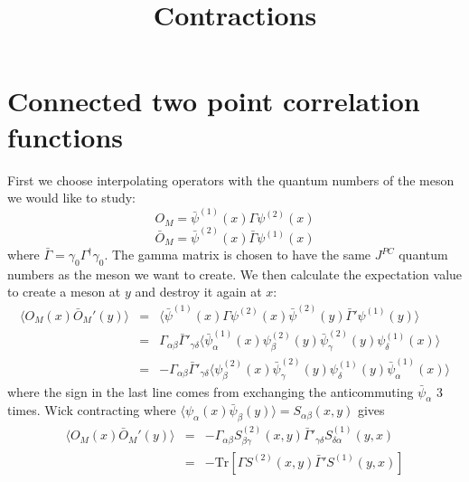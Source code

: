 \documentclass[3p,preprint]{elsarticle}
\begin{document}
\title{Contractions}

\section{Connected two point correlation functions}

First we choose interpolating operators with the quantum numbers of the meson we would like to study:
\begin{equation}
O_M = \bar{\psi}^{(1)}(x) \Gamma \psi^{(2)}(x)
\end{equation}
\begin{equation}
\bar{O}_M = \bar{\psi}^{(2)}(x) \bar{ \Gamma } \psi^{(1)}(x)
\end{equation}
where $\bar{ \Gamma } = \gamma_0 \Gamma^\dagger \gamma_0$. The gamma matrix is chosen to have the same $J^{PC}$
quantum numbers as the meson we want to create. We then calculate the expectation value to create a meson at
$y$ and destroy it again at $x$:
\begin{eqnarray}
\langle O_M(x) \bar{O}_M'(y) \rangle &=& \langle \bar{\psi}^{(1)}(x) \Gamma \psi^{(2)}(x) \bar{\psi}^{(2)}(y) \bar{ \Gamma }' \psi^{(1)}(y) \rangle 
\\
&=& \Gamma_{\alpha \beta} \bar{ \Gamma }'_{\gamma \delta} \langle \bar{\psi}^{(1)}_\alpha(x)  \psi^{(2)}_\beta(y) \bar{\psi}^{(2)}_\gamma(y)  \psi^{(1)}_\delta(x) \rangle \\
&=& -\Gamma_{\alpha \beta} \bar{ \Gamma }'_{\gamma \delta} \langle \psi^{(2)}_\beta(x) \bar{\psi}^{(2)}_\gamma(y)  \psi^{(1)}_\delta(y) 
\bar{\psi}^{(1)}_\alpha (x) \rangle
\end{eqnarray}
where the sign in the last line comes from exchanging the anticommuting $\bar{\psi}_\alpha$ 3 times. Wick contracting where $\langle \psi_\alpha(x) \bar{\psi}_\beta(y) \rangle = S_{\alpha \beta}(x,y)$ gives
\begin{eqnarray}
\langle O_M(x) \bar{O}_M'(y) \rangle &=& -\Gamma_{\alpha \beta} S^{(2)}_{\beta \gamma} (x,y) \bar{ \Gamma }'_{\gamma \delta} S^{(1)}_{\delta \alpha} (y,x) \\
&=& -\text{Tr}\left[ \Gamma S^{(2)} (x,y) \bar{ \Gamma }' S^{(1)} (y,x) \right]
\end{eqnarray}
\end{document}
